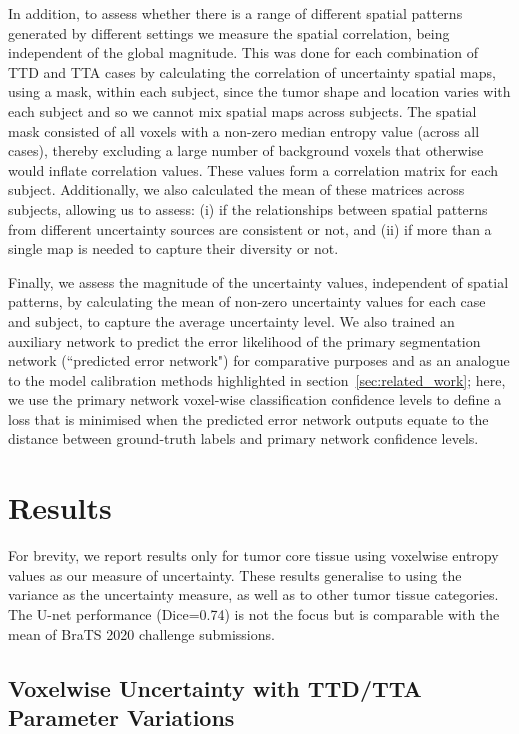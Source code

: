 \documentclass[runningheads]{llncs}
\begin{document}
In addition, to assess whether there is a range of different spatial patterns generated by different settings we measure the spatial correlation, being independent of the global magnitude. This was done for each combination of TTD and TTA cases by calculating the correlation of uncertainty spatial maps, using a mask, within each subject, since the tumor shape and location varies with each subject and so we cannot mix spatial maps across subjects. The spatial mask consisted of all voxels with a non-zero median entropy value (across all cases), thereby excluding a large number of background voxels that otherwise would inflate correlation values. These values form a correlation matrix for each subject. Additionally, we also calculated the mean of these matrices across subjects, allowing us to assess: (i) if the relationships between spatial patterns from different uncertainty sources are consistent or not, and (ii) if more than a single map is needed to capture their diversity or not.

Finally, we assess the magnitude of the uncertainty values, independent of spatial patterns, by calculating the mean of non-zero uncertainty values for each case and subject, to capture the average uncertainty level. We also trained an auxiliary network to predict the error likelihood of the primary segmentation network (``predicted error network") for comparative purposes and as an analogue to the model calibration methods highlighted in section~\ref{sec:related_work}; here, we use the primary network voxel-wise classification confidence levels to define a loss that is minimised when the predicted error network outputs equate to the distance between ground-truth labels and primary network confidence levels. 

\section{Results}

For brevity, we report results only for tumor core tissue using voxelwise entropy values as our measure of uncertainty. These results generalise to using the variance as the uncertainty measure, as well as to other tumor tissue categories. The U-net performance (Dice=0.74) is not the focus but is comparable with the mean of BraTS 2020 challenge submissions.

\subsection{Voxelwise Uncertainty with TTD/TTA Parameter Variations}
\end{document}
